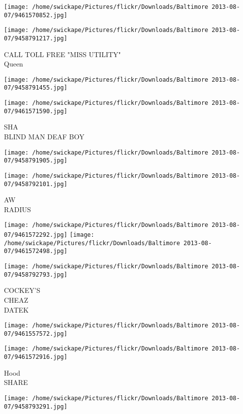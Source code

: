 \documentclass[10pt,letterpaper]{article}
\begin{document}
\texttt{[image: /home/swickape/Pictures/flickr/Downloads/Baltimore 2013-08-07/9461570852.jpg]}

\vspace{0.25in}
\texttt{[image: /home/swickape/Pictures/flickr/Downloads/Baltimore 2013-08-07/9458791217.jpg]}

CALL TOLL FREE "MISS UTILITY"\\
Queen
\pagebreak

\texttt{[image: /home/swickape/Pictures/flickr/Downloads/Baltimore 2013-08-07/9458791455.jpg]}

\vspace{0.25in}
\texttt{[image: /home/swickape/Pictures/flickr/Downloads/Baltimore 2013-08-07/9461571590.jpg]}

SHA\\
BLIND MAN DEAF BOY
\pagebreak

\texttt{[image: /home/swickape/Pictures/flickr/Downloads/Baltimore 2013-08-07/9458791905.jpg]}

\vspace{0.25in}
\texttt{[image: /home/swickape/Pictures/flickr/Downloads/Baltimore 2013-08-07/9458792101.jpg]}

AW\\
RADIUS
\pagebreak

\texttt{[image: /home/swickape/Pictures/flickr/Downloads/Baltimore 2013-08-07/9461572292.jpg]}
\texttt{[image: /home/swickape/Pictures/flickr/Downloads/Baltimore 2013-08-07/9461572498.jpg]}

\vspace{0.25in}
\texttt{[image: /home/swickape/Pictures/flickr/Downloads/Baltimore 2013-08-07/9458792793.jpg]}

COCKEY'S\\
CHEAZ\\
DATEK
\pagebreak

\texttt{[image: /home/swickape/Pictures/flickr/Downloads/Baltimore 2013-08-07/9461557572.jpg]}

\vspace{0.25in}
\texttt{[image: /home/swickape/Pictures/flickr/Downloads/Baltimore 2013-08-07/9461572916.jpg]}

Hood\\
SHARE
\pagebreak

\texttt{[image: /home/swickape/Pictures/flickr/Downloads/Baltimore 2013-08-07/9458793291.jpg]}
\end{document}

